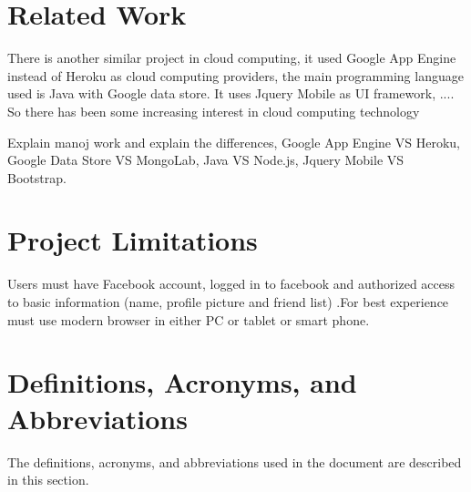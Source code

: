 \section{Related Work}
There is another similar project in cloud computing, it used Google App Engine instead of Heroku as cloud computing providers, the main programming language used is Java with Google data store. It uses Jquery Mobile as UI framework, ....
So there has been some increasing interest in cloud computing technology  

Explain manoj work and explain the differences, Google App Engine VS Heroku, Google Data Store VS MongoLab, Java VS Node.js, Jquery Mobile VS Bootstrap. \cite{Manoj}

\section{Project Limitations}
Users must have Facebook account,  logged in to facebook and authorized access to basic information (name, profile picture and friend list) .For best experience must use modern browser in either PC or tablet or smart phone.    

\section{Definitions, Acronyms, and Abbreviations}

The definitions, acronyms, and abbreviations used in the document are described in this section.

